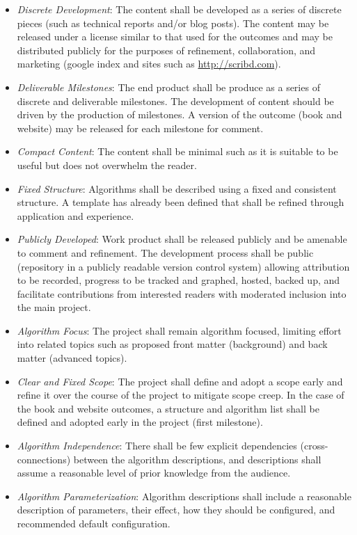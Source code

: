 \documentclass[a4paper, 11pt]{article}
\begin{document}
\begin{itemize}
	\item \emph{Discrete Development}: The content shall be developed as a series of discrete pieces (such as technical reports and/or blog posts). The content may be released under a license similar to that used for the outcomes and may be distributed publicly for the purposes of refinement, collaboration, and marketing (google index and sites such as \url{http://scribd.com}). 
	\item \emph{Deliverable Milestones}: The end product shall be produce as a series of discrete and deliverable milestones. The development of content should be driven by the production of milestones. A version of the outcome (book and website) may be released for each milestone for comment.
	\item \emph{Compact Content}: The content shall be minimal such as it is suitable to be useful but does not overwhelm the reader.
	\item \emph{Fixed Structure}: Algorithms shall be described using a fixed and consistent structure. A template has already been defined \cite{Brownlee2010a} that shall be refined through application and experience. 
	\item \emph{Publicly Developed}: Work product shall be released publicly and be amenable to comment and refinement. The development process shall be public (repository in a publicly readable version control system) allowing attribution to be recorded, progress to be tracked and graphed, hosted, backed up, and facilitate contributions from interested readers with moderated inclusion into the main project.
	\item \emph{Algorithm Focus}: The project shall remain algorithm focused, limiting effort into related topics such as proposed front matter (background) and back matter (advanced topics).
	\item \emph{Clear and Fixed Scope}: The project shall define and adopt a scope early and refine it over the course of the project to mitigate scope creep. In the case of the book and website outcomes, a structure and algorithm list shall be defined and adopted early in the project (first milestone).
	\item \emph{Algorithm Independence}: There shall be few explicit dependencies (cross-connections) between the algorithm descriptions, and descriptions shall assume a reasonable level of prior knowledge from the audience. 
	\item \emph{Algorithm Parameterization}: Algorithm descriptions shall include a reasonable description of parameters, their effect, how they should be configured, and recommended default configuration.
\end{itemize}
\end{document}
